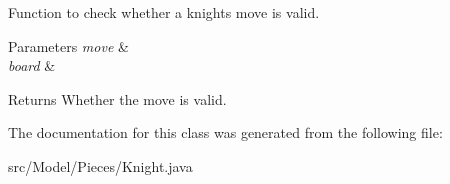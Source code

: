 Function to check whether a knight\textquotesingle{}s move is valid. 
\begin{DoxyParams}{Parameters}
{\em move} & \\
\hline
{\em board} & \\
\hline
\end{DoxyParams}
\begin{DoxyReturn}{Returns}
Whether the move is valid. 
\end{DoxyReturn}


The documentation for this class was generated from the following file\+:\begin{DoxyCompactItemize}
\item 
src/\+Model/\+Pieces/Knight.\+java\end{DoxyCompactItemize}
